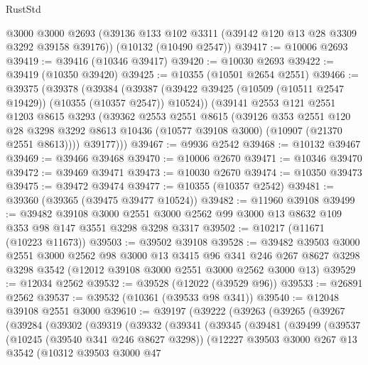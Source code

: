\begin{lexlean}{RustStd}
\begin{coremodule}
    @3000
    @3000
    @2693
    (@39136 @133 @102 @3311 (@39142 @120 @13 @28 @3309 @3292 @39158 @39176))
    (@10132 (@10490 @2547))
@39417 := @10006 @2693
@39419 := @39416 (@10346 @39417)
@39420 := @10030 @2693
@39422 := @39419 (@10350 @39420)
@39425 := @10355 (@10501 @2654 @2551)
@39466 := @39375
    (@39378
      (@39384
        (@39387 (@39422 @39425 (@10509 (@10511 @2547 @19429)) (@10355 (@10357 @2547)) @10524))
        (@39141
          @2553
          @121
          @2551
          @1203
          @8615
          @3293
          (@39362
            @2553
            @2551
            @8615
            (@39126
              @353
              @2551
              @120
              @28
              @3298
              @3292
              @8613
              @10436
              (@10577 @39108 @3000)
              (@10907 (@21370 @2551 @8613))))
          @39177)))
@39467 := @9936 @2542
@39468 := @10132 @39467
@39469 := @39466 @39468
@39470 := @10006 @2670
@39471 := @10346 @39470
@39472 := @39469 @39471
@39473 := @10030 @2670
@39474 := @10350 @39473
@39475 := @39472 @39474
@39477 := @10355 (@10357 @2542)
@39481 := @39360 (@39365 (@39475 @39477 @10524))
@39482 := @11960 @39108
@39499 := @39482
    @39108
    @3000
    @2551
    @3000
    @2562
    @99
    @3000
    @13
    @8632
    @109
    @353
    @98
    @147
    @3551
    @3298
    @3298
    @3317
@39502 := @10217 (@11671 (@10223 @11673))
@39503 := @39502 @39108
@39528 := @39482
    @39503
    @3000
    @2551
    @3000
    @2562
    @98
    @3000
    @13
    @3415
    @96
    @341
    @246
    @267
    @8627
    @3298
    @3298
    @3542
    (@12012 @39108 @3000 @2551 @3000 @2562 @3000 @13)
@39529 := @12034 @2562
@39532 := @39528 (@12022 (@39529 @96))
@39533 := @26891 @2562
@39537 := @39532 (@10361 (@39533 @98 @341))
@39540 := @12048 @39108 @2551 @3000
@39610 := @39197
    (@39222
      (@39263
        (@39265
          (@39267
            (@39284
              (@39302
                (@39319
                  (@39332
                    (@39341
                      (@39345
                        (@39481
                          (@39499
                            (@39537
                              (@10245 (@39540 @341 @246 @8627 @3298))
                              (@12227
                                @39503
                                @3000
                                @267
                                @13
                                @3542
                                (@10312
                                  @39503
                                  @3000
                                  @47

\end{coremodule}
\end{lexlean}
